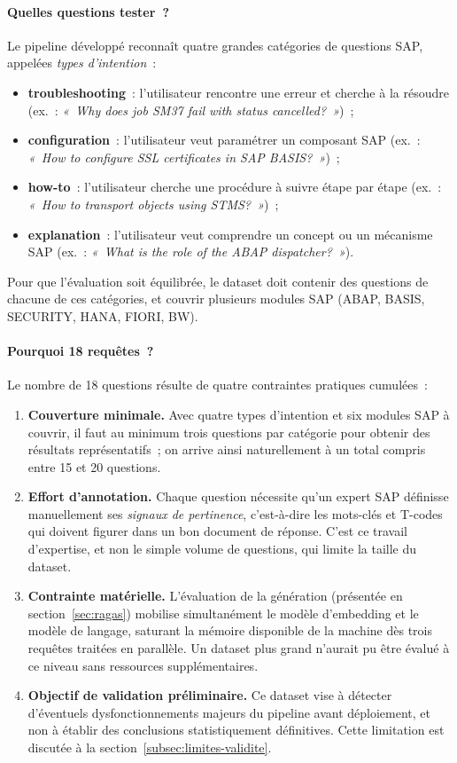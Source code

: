 \paragraph{Quelles questions tester~?}
Le pipeline développé reconnaît quatre grandes catégories de questions SAP, appelées \textit{types d'intention}~:
\begin{itemize}
  \item \textbf{troubleshooting}~: l'utilisateur rencontre une erreur et cherche à la résoudre (ex.~: \textit{«~Why does job SM37 fail with status cancelled?~»})~;
  \item \textbf{configuration}~: l'utilisateur veut paramétrer un composant SAP (ex.~: \textit{«~How to configure SSL certificates in SAP BASIS?~»})~;
  \item \textbf{how-to}~: l'utilisateur cherche une procédure à suivre étape par étape (ex.~: \textit{«~How to transport objects using STMS?~»})~;
  \item \textbf{explanation}~: l'utilisateur veut comprendre un concept ou un mécanisme SAP (ex.~: \textit{«~What is the role of the ABAP dispatcher?~»}).
\end{itemize}
Pour que l'évaluation soit équilibrée, le dataset doit contenir des questions de chacune de ces catégories, et couvrir plusieurs modules SAP (ABAP, BASIS, SECURITY, HANA, FIORI, BW).

\paragraph{Pourquoi 18 requêtes~?}
Le nombre de 18 questions résulte de quatre contraintes pratiques cumulées~:

\begin{enumerate}
  \item \textbf{Couverture minimale.} Avec quatre types d'intention et six modules SAP à couvrir, il faut au minimum trois questions par catégorie pour obtenir des résultats représentatifs~; on arrive ainsi naturellement à un total compris entre 15 et 20 questions.
  \item \textbf{Effort d'annotation.} Chaque question nécessite qu'un expert SAP définisse manuellement ses \textit{signaux de pertinence}, c'est-à-dire les mots-clés et T-codes qui doivent figurer dans un bon document de réponse. C'est ce travail d'expertise, et non le simple volume de questions, qui limite la taille du dataset.
  \item \textbf{Contrainte matérielle.} L'évaluation de la génération (présentée en section~\ref{sec:ragas}) mobilise simultanément le modèle d'embedding et le modèle de langage, saturant la mémoire disponible de la machine dès trois requêtes traitées en parallèle. Un dataset plus grand n'aurait pu être évalué à ce niveau sans ressources supplémentaires.
  \item \textbf{Objectif de validation préliminaire.} Ce dataset vise à détecter d'éventuels dysfonctionnements majeurs du pipeline avant déploiement, et non à établir des conclusions statistiquement définitives. Cette limitation est discutée à la section~\ref{subsec:limites-validite}.
\end{enumerate}

